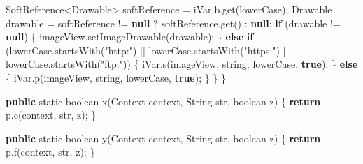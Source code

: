 \documentclass[
]{article}
\newenvironment{Shaded}{}{}
\newcommand{\BuiltInTok}[1]{\textcolor[rgb]{0.00,0.50,0.00}{#1}}
\newcommand{\ControlFlowTok}[1]{\textcolor[rgb]{0.00,0.44,0.13}{\textbf{#1}}}
\newcommand{\DataTypeTok}[1]{\textcolor[rgb]{0.56,0.13,0.00}{#1}}
\newcommand{\FunctionTok}[1]{\textcolor[rgb]{0.02,0.16,0.49}{#1}}
\newcommand{\KeywordTok}[1]{\textcolor[rgb]{0.00,0.44,0.13}{\textbf{#1}}}
\newcommand{\NormalTok}[1]{#1}
\newcommand{\OperatorTok}[1]{\textcolor[rgb]{0.40,0.40,0.40}{#1}}
\newcommand{\StringTok}[1]{\textcolor[rgb]{0.25,0.44,0.63}{#1}}
\begin{document}
\begin{Shaded}
\begin{Highlighting}[]
            \BuiltInTok{SoftReference}\OperatorTok{\textless{}}\NormalTok{Drawable}\OperatorTok{\textgreater{}}\NormalTok{ softReference }\OperatorTok{=}\NormalTok{ iVar}\OperatorTok{.}\FunctionTok{b}\OperatorTok{.}\FunctionTok{get}\OperatorTok{(}\NormalTok{lowerCase}\OperatorTok{);}
\NormalTok{            Drawable drawable }\OperatorTok{=}\NormalTok{ softReference }\OperatorTok{!=} \KeywordTok{null} \OperatorTok{?}\NormalTok{ softReference}\OperatorTok{.}\FunctionTok{get}\OperatorTok{()} \OperatorTok{:} \KeywordTok{null}\OperatorTok{;}
            \ControlFlowTok{if} \OperatorTok{(}\NormalTok{drawable }\OperatorTok{!=} \KeywordTok{null}\OperatorTok{)} \OperatorTok{\{}
\NormalTok{                imageView}\OperatorTok{.}\FunctionTok{setImageDrawable}\OperatorTok{(}\NormalTok{drawable}\OperatorTok{);}
            \OperatorTok{\}} \ControlFlowTok{else} \ControlFlowTok{if} \OperatorTok{(}\NormalTok{lowerCase}\OperatorTok{.}\FunctionTok{startsWith}\OperatorTok{(}\StringTok{"http:"}\OperatorTok{)} \OperatorTok{||}\NormalTok{ lowerCase}\OperatorTok{.}\FunctionTok{startsWith}\OperatorTok{(}\StringTok{"https:"}\OperatorTok{)} \OperatorTok{||}\NormalTok{ lowerCase}\OperatorTok{.}\FunctionTok{startsWith}\OperatorTok{(}\StringTok{"ftp:"}\OperatorTok{))} \OperatorTok{\{}
\NormalTok{                iVar}\OperatorTok{.}\FunctionTok{s}\OperatorTok{(}\NormalTok{imageView}\OperatorTok{,}\NormalTok{ string}\OperatorTok{,}\NormalTok{ lowerCase}\OperatorTok{,} \KeywordTok{true}\OperatorTok{);}
            \OperatorTok{\}} \ControlFlowTok{else} \OperatorTok{\{}
\NormalTok{                iVar}\OperatorTok{.}\FunctionTok{p}\OperatorTok{(}\NormalTok{imageView}\OperatorTok{,}\NormalTok{ string}\OperatorTok{,}\NormalTok{ lowerCase}\OperatorTok{,} \KeywordTok{true}\OperatorTok{);}
            \OperatorTok{\}}
        \OperatorTok{\}}
    \OperatorTok{\}}

    \KeywordTok{public} \DataTypeTok{static} \DataTypeTok{boolean} \FunctionTok{x}\OperatorTok{(}\BuiltInTok{Context}\NormalTok{ context}\OperatorTok{,} \BuiltInTok{String}\NormalTok{ str}\OperatorTok{,} \DataTypeTok{boolean}\NormalTok{ z}\OperatorTok{)} \OperatorTok{\{}
        \ControlFlowTok{return}\NormalTok{ p}\OperatorTok{.}\FunctionTok{c}\OperatorTok{(}\NormalTok{context}\OperatorTok{,}\NormalTok{ str}\OperatorTok{,}\NormalTok{ z}\OperatorTok{);}
    \OperatorTok{\}}

    \KeywordTok{public} \DataTypeTok{static} \DataTypeTok{boolean} \FunctionTok{y}\OperatorTok{(}\BuiltInTok{Context}\NormalTok{ context}\OperatorTok{,} \BuiltInTok{String}\NormalTok{ str}\OperatorTok{,} \DataTypeTok{boolean}\NormalTok{ z}\OperatorTok{)} \OperatorTok{\{}
        \ControlFlowTok{return}\NormalTok{ p}\OperatorTok{.}\FunctionTok{f}\OperatorTok{(}\NormalTok{context}\OperatorTok{,}\NormalTok{ str}\OperatorTok{,}\NormalTok{ z}\OperatorTok{);}
    \OperatorTok{\}}


\end{Highlighting}
\end{Shaded}
\end{document}
